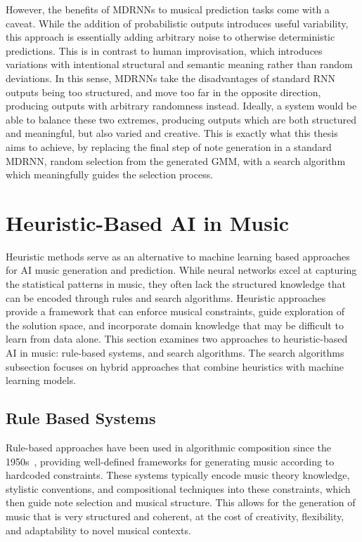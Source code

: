 However, the benefits of MDRNNs to musical prediction tasks come with a caveat. While the addition of probabilistic outputs introduces useful variability, this approach is essentially adding arbitrary noise to otherwise deterministic predictions. This is in contrast to human improvisation, which introduces variations with intentional structural and semantic meaning rather than random deviations. In this sense, MDRNNs take the disadvantages of standard RNN outputs being too structured, and move too far in the opposite direction, producing outputs with arbitrary randomness instead. Ideally, a system would be able to balance these two extremes, producing outputs which are both structured and meaningful, but also varied and creative. This is exactly what this thesis aims to achieve, by replacing the final step of note generation in a standard MDRNN, random selection from the generated GMM, with a search algorithm which meaningfully guides the selection process.

\section{Heuristic-Based AI in Music}
Heuristic methods serve as an alternative to machine learning based approaches for AI music generation and prediction. While neural networks excel at capturing the statistical patterns in music, they often lack the structured knowledge that can be encoded through rules and search algorithms. Heuristic approaches provide a framework that can enforce musical constraints, guide exploration of the solution space, and incorporate domain knowledge that may be difficult to learn from data alone. This section examines two approaches to heuristic-based AI in music: rule-based systems, and search algorithms. The search algorithms subsection focuses on hybrid approaches that combine heuristics with machine learning models.
\subsection{Rule Based Systems}
Rule-based approaches have been used in algorithmic composition since the 1950s~\citep{Hiller1959ILLIAC}, providing well-defined frameworks for generating music according to hardcoded constraints. These systems typically encode music theory knowledge, stylistic conventions, and compositional techniques into these constraints, which then guide note selection and musical structure. This allows for the generation of music that is very structured and coherent, at the cost of creativity, flexibility, and adaptability to novel musical contexts.

